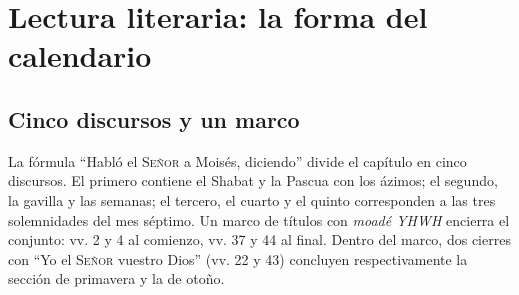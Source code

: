 \documentclass[11pt,letterpaper]{article}
\newcommand{\SENOR}{\textsc{Señor}}
\begin{document}
\section{Lectura literaria: la forma del calendario}\label{sec:literaria}

\subsection{Cinco discursos y un marco}
La fórmula ``Habló el \SENOR{} a Moisés, diciendo'' divide el capítulo en cinco discursos. El primero contiene el Shabat y la Pascua con los ázimos; el segundo, la gavilla y las semanas; el tercero, el cuarto y el quinto corresponden a las tres solemnidades del mes séptimo. Un marco de títulos con \emph{moadé YHWH} encierra el conjunto: vv. 2 y 4 al comienzo, vv. 37 y 44 al final. Dentro del marco, dos cierres con ``Yo el \SENOR{} vuestro Dios'' (vv. 22 y 43) concluyen respectivamente la sección de primavera y la de otoño.
\end{document}
